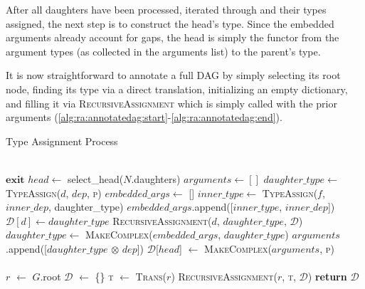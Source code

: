 After all daughters have been processed, iterated through and their types assigned, the next step is to construct the head's type.
Since the embedded arguments already account for gaps, the head is simply the functor from the argument types (as collected in the arguments list) to the parent's type.

It is now straightforward to annotate a full DAG by simply selecting its root node, finding its type via a direct translation, initializing an empty dictionary, and filling it via \textsc{RecursiveAssignment} which is simply called with the prior arguments (\ref{alg:ra:annotatedag:start}-\ref{alg:ra:annotatedag:end}).

\begin{algorithm}{
\caption{Type Assignment Process}\label{alg:ra}
\begin{algorithmic}[1]
\\
\label{alg:ra:recursiveassignment:start}
        \State $\textbf{exit}$
    \EndIf
    \State $head \gets$ select\_head($N$.daughters)
    \label{alg:ra:recursiveassignment:select_head}
    \State $arguments \gets []$
        \State $daughter\_type \gets$ \textsc{TypeAssign}($d$, $dep$, \textsc{p})
        \State $embedded\_args \gets$ []
        \label{alg:ra:recursiveassignment:findhot:start}
                \State $inner\_type \gets$ \textsc{TypeAssign}($f$, $inner\_dep$, daughter\_type)
                \State $embedded\_args$.append([$inner\_type$, $inner\_dep$])
            \EndIf
        \EndFor
        \label{alg:ra:recursiveassignment:findhot:end}
            \State $\mathcal{D}[d] \gets daughter\_type$
            \State \textsc{RecursiveAssignment}($d$, $daughter\_type$, $\mathcal{D}$)
        \EndIf
        \State $daughter\_type \gets$ \textsc{MakeComplex}($embedded\_args$, $daughter\_type$)
            \State $arguments$.append([$daughter\_type$ $\otimes$ $dep$])
        \EndIf
    \EndFor
    \State $\mathcal{D}$[$head$] $\gets$ \textsc{MakeComplex}($arguments$, \textsc{p})
\EndProcedure
\label{alg:ra:recursiveassignment:end}
\\
\\
\label{alg:ra:annotatedag:start}
    \State $r$ $\gets$ $G$.root
    \State $\mathcal{D}$ $\gets$ \{\}
    \State \textsc{t} $\gets$ \textsc{Trans}($r$)
    \State \textsc{RecursiveAssignment}($r$, \textsc{t}, $\mathcal{D}$)
    \State \textbf{return} $\mathcal{D}$
\EndProcedure
\label{alg:ra:annotatedag:end}
\end{algorithmic}
}
\end{algorithm}

